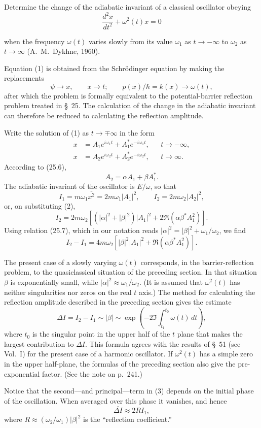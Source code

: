 \ProblemHeading

Determine the change of the adiabatic invariant of a classical oscillator obeying
\begin{equation}
 \frac{d^2x}{dt^2}+\omega^2(t)x=0
 \tag{1}
\end{equation}

when the frequency $\omega(t)$ varies slowly from its value $\omega_1$ as $t\to-\infty$ to $\omega_2$ as $t\to\infty$ (A.~M.~Dykhne, 1960).

\SolutionHeading Equation (1) is obtained from the Schrödinger equation by making the replacements
\[
 \psi\to x,\qquad x\to t;\qquad p(x)/\hbar=k(x)\to\omega(t),
\]
after which the problem is formally equivalent to the potential-barrier reflection problem treated in §~25. The calculation of the change in the adiabatic invariant can therefore be reduced to calculating the reflection amplitude.

Write the solution of (1) as $t\to\mp\infty$ in the form
\[
 \begin{aligned}
 x&=A_1e^{i\omega_1t}+A_1^*e^{-i\omega_1t},&&t\to-\infty,\\
 x&=A_2e^{i\omega_2t}+A_2^*e^{-i\omega_2t},&&t\to\infty.
 \end{aligned}
\]
According to (25.6),
\begin{equation}
 A_2=\alpha A_1+\beta A_1^*.
 \tag{2}
\end{equation}
The adiabatic invariant of the oscillator is $E/\omega$, so that
\[
 I_1=m\omega_1\overline{x^2}=2m\omega_1|A_1|^2,\qquad
 I_2=2m\omega_2|A_2|^2,
\]
or, on substituting (2),
\[
 I_2=2m\omega_2[(|\alpha|^2+|\beta|^2)|A_1|^2+2\Re(\alpha\beta^*A_1^2)].
\]
Using relation (25.7), which in our notation reads $|\alpha|^2=|\beta|^2+\omega_1/\omega_2$, we find
\begin{equation}
 I_2-I_1=4m\omega_2[|\beta|^2|A_1|^2+\Re(\alpha\beta^*A_1^2)].
 \tag{3}
\end{equation}

The present case of a slowly varying $\omega(t)$ corresponds, in the barrier-reflection problem, to the quasiclassical situation of the preceding section. In that situation $\beta$ is exponentially small, while $|\alpha|^2\approx\omega_1/\omega_2$. (It is assumed that $\omega^2(t)$ has neither singularities nor zeros on the real $t$ axis.) The method for calculating the reflection amplitude described in the preceding section gives the estimate
\[
 \Delta I=I_2-I_1\sim|\beta|\sim
 \exp\left(-2\Im\int_{t_1}^{t_0}\omega(t)\,dt\right),
\]
where $t_0$ is the singular point in the upper half of the $t$ plane that makes the largest contribution to $\Delta I$. This formula agrees with the results of §~51 (see Vol.~I) for the present case of a harmonic oscillator. If $\omega^2(t)$ has a simple zero in the upper half-plane, the formulas of the preceding section also give the pre-exponential factor. (See the note on p.~241.)

Notice that the second---and principal---term in (3) depends on the initial phase of the oscillation. When averaged over this phase it vanishes, and hence
\[
 \overline{\Delta I}\approx2RI_1,
\]
where $R\approx(\omega_2/\omega_1)|\beta|^2$ is the ``reflection coefficient.''
